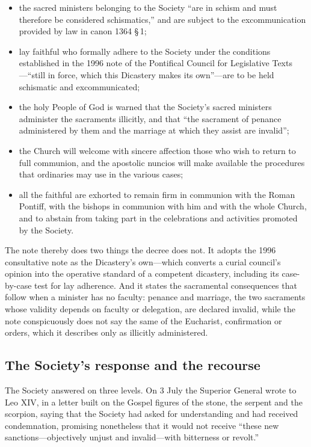 \begin{itemize}
\item the sacred ministers belonging to the Society ``are in schism and
must therefore be considered schismatics,'' and are subject to the
excommunication provided by law in canon 1364 \S\,1;
\item lay faithful who formally adhere to the Society under the
conditions established in the 1996 note of the Pontifical Council for
Legislative Texts---``still in force, which this Dicastery makes its
own''---are to be held schismatic and excommunicated;
\item the holy People of God is warned that the Society's sacred
ministers administer the sacraments illicitly, and that ``the sacrament
of penance administered by them and the marriage at which they assist are
invalid'';
\item the Church will welcome with sincere affection those who wish to
return to full communion, and the apostolic nuncios will make available
the procedures that ordinaries may use in the various cases;
\item all the faithful are exhorted to remain firm in communion with the
Roman Pontiff, with the bishops in communion with him and with the whole
Church, and to abstain from taking part in the celebrations and
activities promoted by the Society.
\end{itemize}

The note thereby does two things the decree does not. It adopts the 1996
consultative note as the Dicastery's own---which converts a curial
council's opinion into the operative standard of a competent dicastery,
including its case-by-case test for lay adherence. And it states the
sacramental consequences that follow when a minister has no faculty:
penance and marriage, the two sacraments whose validity depends on
faculty or delegation, are declared invalid, while the note conspicuously
does not say the same of the Eucharist, confirmation or orders, which it
describes only as illicitly administered.

\subsection{The Society's response and the recourse}

The Society answered on three levels. On 3 July the Superior General
wrote to Leo XIV, in a letter built on the Gospel figures of the stone,
the serpent and the scorpion, saying that the Society had asked for
understanding and had received condemnation, promising nonetheless that
it would not receive ``these new sanctions---objectively unjust and
invalid---with bitterness or revolt.''

